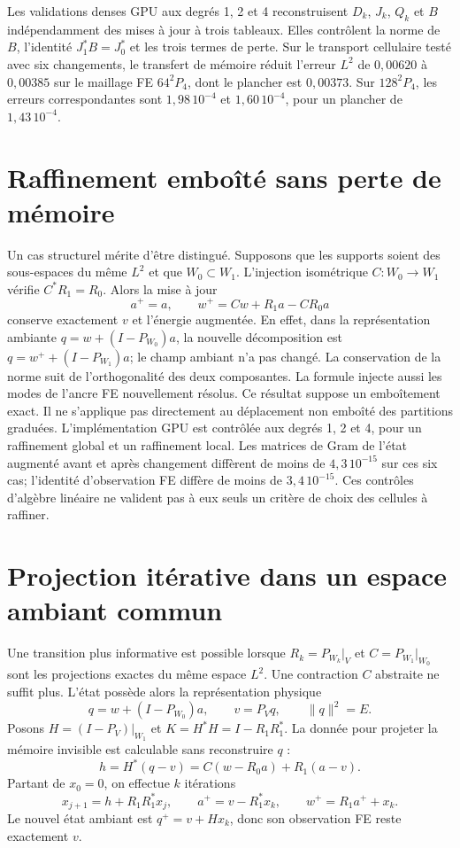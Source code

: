 \documentclass[11pt,a4paper]{article}
\begin{document}
Les validations denses GPU aux degrés 1, 2 et 4 reconstruisent $D_k$,
$J_k$, $Q_k$ et $B$ indépendamment des mises à jour à trois tableaux.
Elles contrôlent la norme de $B$, l'identité $J_1^*B=J_0^*$ et les trois
termes de perte. Sur le transport cellulaire testé avec six changements,
le transfert de mémoire réduit l'erreur $L^2$ de $0{,}00620$ à $0{,}00385$
sur le maillage FE $64^2P_4$, dont le plancher est $0{,}00373$.
Sur $128^2P_4$, les erreurs correspondantes sont $1{,}98\,10^{-4}$ et
$1{,}60\,10^{-4}$, pour un plancher de $1{,}43\,10^{-4}$.

\section{Raffinement emboîté sans perte de mémoire}
Un cas structurel mérite d'être distingué. Supposons que les supports
soient des sous-espaces du même $L^2$ et que $W_0\subset W_1$.
L'injection isométrique $C:W_0\to W_1$ vérifie $C^*R_1=R_0$.
Alors la mise à jour
\[
 a^+=a,\qquad w^+=Cw+R_1a-CR_0a
\]
conserve exactement $v$ et l'énergie augmentée. En effet, dans la
représentation ambiante $q=w+(I-P_{W_0})a$, la nouvelle décomposition
est $q=w^++(I-P_{W_1})a$; le champ ambiant n'a pas changé.
La conservation de la norme suit de l'orthogonalité des deux composantes.
La formule injecte aussi les modes de l'ancre FE nouvellement résolus.
Ce résultat suppose un emboîtement exact. Il ne s'applique pas directement
au déplacement non emboîté des partitions graduées.
L'implémentation GPU est contrôlée aux degrés 1, 2 et 4, pour un
raffinement global et un raffinement local. Les matrices de Gram de
l'état augmenté avant et après changement diffèrent de moins de
$4{,}3\,10^{-15}$ sur ces six cas; l'identité d'observation FE diffère
de moins de $3{,}4\,10^{-15}$. Ces contrôles d'algèbre linéaire ne valident
pas à eux seuls un critère de choix des cellules à raffiner.

\section{Projection itérative dans un espace ambiant commun}
Une transition plus informative est possible lorsque $R_k=P_{W_k}|_V$
et $C=P_{W_1}|_{W_0}$ sont les projections exactes du même espace $L^2$.
Une contraction $C$ abstraite ne suffit plus. L'état possède alors la
représentation physique
\[
 q=w+(I-P_{W_0})a,\qquad v=P_Vq,\qquad \|q\|^2=E.
\]
Posons $H=(I-P_V)|_{W_1}$ et $K=H^*H=I-R_1R_1^*$.
La donnée pour projeter la mémoire invisible est calculable sans
reconstruire $q$ :
\[
 h=H^*(q-v)=C(w-R_0a)+R_1(a-v).
\]
Partant de $x_0=0$, on effectue $k$ itérations
\[
 x_{j+1}=h+R_1R_1^*x_j,
 \qquad a^+=v-R_1^*x_k,\qquad w^+=R_1a^++x_k.
\]
Le nouvel état ambiant est $q^+=v+Hx_k$, donc son observation FE
reste exactement $v$.
\end{document}
